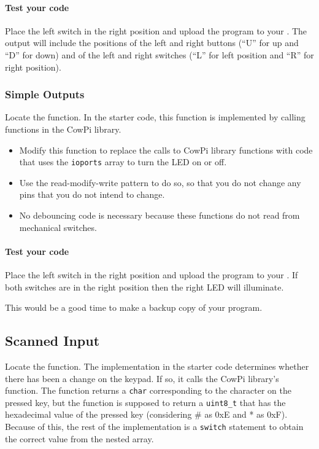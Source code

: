 \paragraph{Test your code}

Place the left switch in the right position and upload the program to your \developmentboard.
The output will include the positions of the left and right buttons (``U'' for up and ``D'' for down) and of the left and right switches (``L'' for left position and ``R'' for right position).


\subsubsection{Simple Outputs}

Locate the  function.
In the starter code, this function is implemented by calling functions in the CowPi library.

\begin{itemize}
    \item Modify this function to replace the calls to CowPi library functions with code that uses the \lstinline{ioports} array to turn the LED on or off.
    \item Use the read-modify-write pattern to do so, so that you do not change any pins that you do not intend to change.
    \item No debouncing code is necessary because these functions do not read from mechanical switches.
\end{itemize}

\paragraph{Test your code}

Place the left switch in the right position and upload the program to your \developmentboard.
If both switches are in the right position then the right LED will illuminate.

\vspace{1cm}

This would be a good time to make a backup copy of your program.


\subsection{Scanned Input} \label{subsec:ScannedInput}

Locate the  function.
The implementation in the starter code determines whether there has been a change on the keypad.
If so, it calls the CowPi library's  function.
The  function returns a \lstinline{char} corresponding to the character on the pressed key,
but the  function is supposed to return a \lstinline{uint8_t} that has the hexadecimal value of the pressed key (considering \# as 0xE and * as 0xF).
Because of this, the rest of the implementation is a \lstinline{switch} statement to obtain the correct value from the  nested array.


